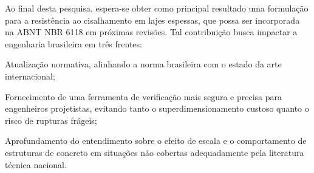 Ao final desta pesquisa, espera-se obter como principal resultado uma formulação para a resistência ao cisalhamento em lajes espessas, que possa ser incorporada na ABNT NBR 6118 em próximas revisões. Tal contribuição busca impactar a engenharia brasileira em três frentes:

\begin{alineas}
    \item Atualização normativa, alinhando a norma brasileira com o estado da arte internacional;
    \item Fornecimento de uma ferramenta de verificação mais segura e precisa para engenheiros projetistas, evitando tanto o superdimensionamento custoso quanto o risco de rupturas frágeis;
    \item Aprofundamento do entendimento sobre o efeito de escala e o comportamento de estruturas de concreto em situações não cobertas adequadamente pela literatura técnica nacional.
\end{alineas}

\postextual


\printbibliography

